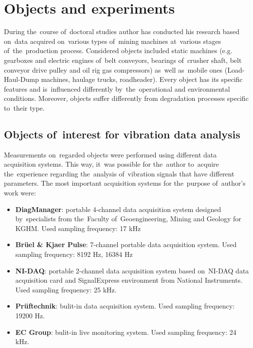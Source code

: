 

\chapter{Objects and experiments}

During the~course of~doctoral studies author has conducted his research based on~data acquired on~various types of~mining machines at~various stages of~the~production process. Considered objects included static machines (e.g. gearboxes and electric engines of~belt conveyors, bearings of~crusher shaft, belt conveyor drive pulley and oil rig gas compressors) as~well as~mobile ones (Load-Haul-Dump machines, haulage trucks, roadheader). Every object has its specific features and is~influenced differently by~the~operational and environmental conditions. Moreover, objects suffer differently from degradation processes specific to~their type.

\section{Objects of~interest for vibration data analysis}

Measurements on~regarded objects were performed using different data acquisition systems. This way, it~was possible for the~author to~acquire the~experience regarding the~analysis of~vibration signals that have different parameters. The most important acquisition systems for the~purpose of~author's work were:

\begin{itemize}
  \item \textbf{DiagManager}: portable 4-channel data acquisition system designed by~specialists from the~Faculty of~Geoengineering, Mining and Geology for KGHM. Used sampling frequency: 17 kHz 
  \item \textbf{Br{\"u}el \& Kjaer Pulse}: 7-channel portable data acquisition system. Used sampling frequency: 8192 Hz, 16384 Hz
  \item \textbf{NI-DAQ}: portable 2-channel data acquisition system based on~NI-DAQ data acquisition card and SignalExpress environment from National Instruments. Used sampling frequency: 25 kHz.
  \item \textbf{Pr{\"u}ftechnik}: bulit-in data acquisition system. Used sampling frequency: 19200 Hz.
  \item \textbf{EC Group}: bulit-in live monitoring system. Used sampling frequency: 24 kHz.
\end{itemize}

